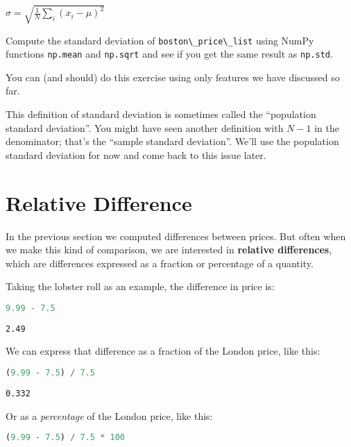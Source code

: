 \(\sigma = \sqrt{\frac{1}{N} \sum_i (x_i - \mu)^2}\)

Compute the standard deviation of
\passthrough{\lstinline!boston\_price\_list!} using NumPy functions
\passthrough{\lstinline!np.mean!} and \passthrough{\lstinline!np.sqrt!}
and see if you get the same result as \passthrough{\lstinline!np.std!}.

You can (and should) do this exercise using only features we have
discussed so far.

This definition of standard deviation is sometimes called the
``population standard deviation''. You might have seen another
definition with \(N-1\) in the denominator; that's the ``sample standard
deviation''. We'll use the population standard deviation for now and
come back to this issue later.

\hypertarget{relative-difference}{%
\section{Relative Difference}\label{relative-difference}}

In the previous section we computed differences between prices. But
often when we make this kind of comparison, we are interested in
\textbf{relative differences}, which are differences expressed as a
fraction or percentage of a quantity.

Taking the lobster roll as an example, the difference in price is:

\begin{lstlisting}[language=Python,style=source]
9.99 - 7.5
\end{lstlisting}

\begin{lstlisting}[style=output]
2.49
\end{lstlisting}

We can express that difference as a fraction of the London price, like
this:

\begin{lstlisting}[language=Python,style=source]
(9.99 - 7.5) / 7.5
\end{lstlisting}

\begin{lstlisting}[style=output]
0.332
\end{lstlisting}

Or as a \emph{percentage} of the London price, like this:

\begin{lstlisting}[language=Python,style=source]
(9.99 - 7.5) / 7.5 * 100
\end{lstlisting}


